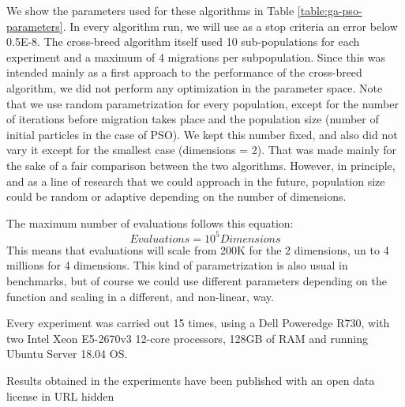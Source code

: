\documentclass[runningheads]{llncs}
\begin{document}
We show the parameters used for these algorithms in Table
\ref{table:ga-pso-parameters}. In every algorithm run, we will use as a
stop criteria an error below 0.5E-8. The cross-breed algorithm
itself used 10 sub-populations for each
experiment and a maximum of 4 migrations per subpopulation.
Since this was intended mainly as a first approach to the performance of the cross-breed algorithm, we
did not perform any optimization in the parameter space. Note
that we use random parametrization for every population, except for
the number of iterations before migration takes place and 
the population size (number of initial particles in the case of PSO). 
We kept this number fixed, and also did not vary it except for the smallest case
(dimensions = 2). That was made mainly for the sake of a fair
comparison between the two algorithms. However, in principle, and as a line of
research that we could approach in the future, population size could be
random or adaptive depending on the number of dimensions.

The maximum number of evaluations follows this equation:
\begin{equation}
    \label{eq:hesitancy-interpretation}
   Evaluations = 10^{5} Dimensions
   \end{equation}
This means that evaluations will scale from 200K for the 2 dimensions,
un to 4 millions for 4 dimensions.  This kind of parametrization is
also usual in benchmarks, but of course we could use different
parameters depending on the function and scaling in a different, and
non-linear, way. 

Every experiment was carried out 15 times, using a Dell Poweredge
R730, with two Intel Xeon E5-2670v3 12-core processors, 128GB of RAM and
running Ubuntu Server 18.04 OS.

Results obtained in the experiments have been published with an open
data license in {URL hidden}
\end{document}
